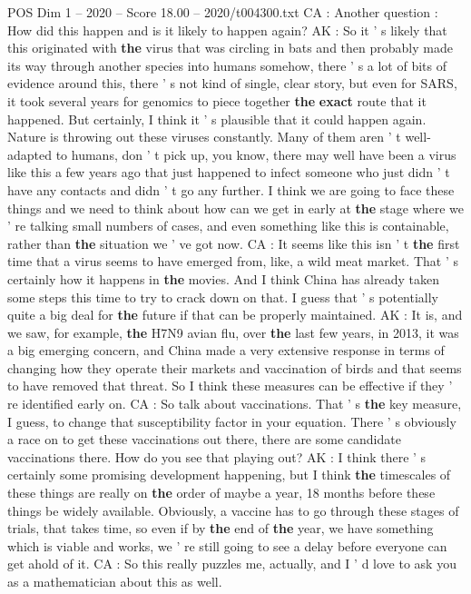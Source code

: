 \begin{textsample}{POS Dim 1 – 2020 – Score 18.00 – 2020/t004300.txt}
CA : Another question : How did this happen and is it likely to happen again?
AK : So it ' s likely that this originated with \textbf{the} virus that was circling in bats and then probably made its way through another species into humans somehow, there ' s a lot of bits of evidence around this, there ' s not kind of single, clear story, but even for SARS, it took several years for genomics to piece together \textbf{the} \textbf{exact} route that it happened.
But certainly, I think it ' s plausible that it could happen again.
Nature is throwing out these viruses constantly.
Many of them aren ' t well-adapted to humans, don ' t pick up, you know, there may well have been a virus like this a few years ago that just happened to infect someone who just didn ' t have any contacts and didn ' t go any further.
I think we are going to face these things and we need to think about how can we get in early at \textbf{the} stage where we ' re talking small numbers of cases, and even something like this is containable, rather than \textbf{the} situation we ' ve got now.
CA : It seems like this isn ' t \textbf{the} first time that a virus seems to have emerged from, like, a wild meat market.
That ' s certainly how it happens in \textbf{the} movies.
And I think China has already taken some steps this time to try to crack down on that.
I guess that ' s potentially quite a big deal for \textbf{the} future if that can be properly maintained.
AK : It is, and we saw, for example, \textbf{the} H7N9 avian flu, over \textbf{the} last few years, in 2013, it was a big emerging concern, and China made a very extensive response in terms of changing how they operate their markets and vaccination of birds and that seems to have removed that threat.
So I think these measures can be effective if they ' re identified early on.
CA : So talk about vaccinations.
That ' s \textbf{the} key measure, I guess, to change that susceptibility factor in your equation.
There ' s obviously a race on to get these vaccinations out there, there are some candidate vaccinations there.
How do you see that playing out?
AK : I think there ' s certainly some promising development happening, but I think \textbf{the} timescales of these things are really on \textbf{the} order of maybe a year, 18 months before these things be widely available.
Obviously, a vaccine has to go through these stages of trials, that takes time, so even if by \textbf{the} end of \textbf{the} year, we have something which is viable and works, we ' re still going to see a delay before everyone can get ahold of it.
CA : So this really puzzles me, actually, and I ' d love to ask you as a mathematician about this as well.

\end{textsample}
